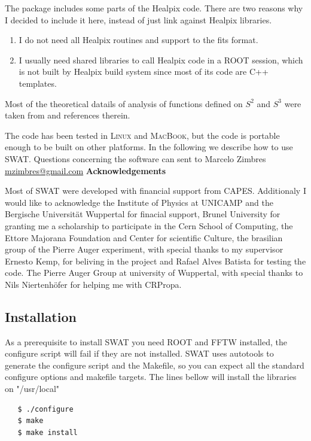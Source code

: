 \documentclass[12pt]{article}
\begin{document}
The package includes some parts of the Healpix code. There are two reasons why
I decided to include it here, instead of just link against Healpix libraries.
\begin{enumerate}
\item I do not need all Healpix routines and support to the fits format. 
\item I usually need shared libraries to call Healpix code in a ROOT session,
which is not built by Healpix build system since most of its code are C++
templates.
\end{enumerate}

Most of the theoretical datails of analysis of functions defined on $S^2$ and $S^3$ 
were taken from \cite{wiaux} and references therein. 

The code has been tested in \textsc{Linux} and \textsc{MacBook}, but the code
is portable enough to be built on other platforms.  In the following we
describe how to use SWAT. Questions concerning the software can sent to Marcelo
Zimbres \href{mailto:mzimbres@gmail.com}{mzimbres@gmail.com}
\vspace{0.7cm}
\newline
{\bf \large Acknowledgements}
\vspace{0.7cm}

Most of SWAT were developed with financial support from CAPES.  Additionaly I
would like to acknowledge the Institute of Physics at UNICAMP and the Bergische
Universit\"at Wuppertal for finacial support, Brunel University for granting me a
scholarship to participate in the Cern School of Computing, the Ettore Majorana
Foundation and Center for scientific Culture, the brasilian group of the Pierre
Auger experiment, with special thanks to my supervisor Ernesto Kemp, for
beliving in the project and Rafael Alves Batista for testing the code. The
Pierre Auger Group at university of Wuppertal, with special thanks to Nils
Niertenh\"ofer for helping me with CRPropa.

\subsection{Installation} \label{ch::installation}
As a prerequisite to install SWAT you need ROOT and FFTW installed, the
configure script will fail if they are not installed. SWAT uses autotools to
generate the configure script and the Makefile, so you can expect all the
standard configure options and makefile targets. The lines bellow will install
the libraries on {\color{brown}"/usr/local"}
{\bf \color{brown}
   \begin{lstlisting}
   $ ./configure
   $ make
   $ make install
   \end{lstlisting}
}
\end{document}
